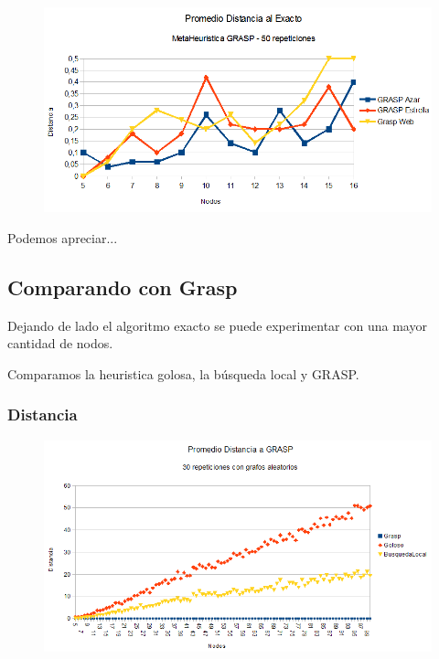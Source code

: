 \begin{figure}[H]
	\centering
	\includegraphics[scale=0.6]{distancia-GRASP.png}
\end{figure}

\quad Podemos apreciar...

\quad


\quad



\subsection{Comparando con Grasp}

\quad Dejando de lado el algoritmo exacto se puede experimentar con una mayor cantidad de nodos.

\quad Comparamos la heuristica golosa, la búsqueda local y GRASP.

\quad 

\subsubsection{Distancia}

\begin{figure}[H]
	\centering
	\includegraphics[scale=0.8]{distancia-Grasp-Azar.png}
\end{figure}

